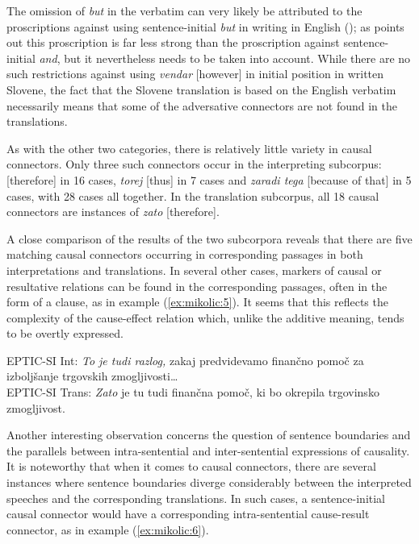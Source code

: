 \documentclass[output=paper]{langscibook}
\begin{document}
The omission of \textit{but} in the verbatim can very likely be attributed to the proscriptions against using sentence-initial \textit{but} in writing in English (\citealt[cf.][183]{Bell2007}); as \citet[194]{Bell2007} points out this proscription is far less strong than the proscription against sentence-initial \textit{and}, but it nevertheless needs to be taken into account. While there are no such restrictions against using \textit{vendar} [however] in initial position in written Slovene, the fact that the Slovene translation is based on the English verbatim necessarily means that some of the adversative connectors are not found in the translations.

As with the other two categories, there is relatively little variety in causal connectors. Only three such connectors occur in the interpreting subcorpus:  [therefore] in 16 cases, \textit{torej} [thus] in 7 cases and \textit{zaradi tega} [because of that] in 5 cases, with 28 cases all together. In the translation subcorpus, all 18 causal connectors are instances of \textit{zato} [therefore].

A close comparison of the results of the two subcorpora reveals that there are five matching causal connectors occurring in corresponding passages in both interpretations and translations. In several other cases, markers of causal or resultative relations can be found in the corresponding passages, often in the form of a clause, as in example (\ref{ex:mikolic:5}). It seems that this reflects the complexity of the cause-effect relation which, unlike the additive meaning, tends to be overtly expressed. 

\ea\label{ex:mikolic:5}
\ea
EPTIC-SI Int: \textit{To je tudi razlog,} zakaj predvidevamo finančno pomoč za izboljšanje trgovskih zmogljivosti\ldots\\
\ex
EPTIC-SI Trans: \textit{Zato} je tu tudi finančna pomoč, ki bo okrepila trgovinsko zmogljivost. \\
\z
\z

Another interesting observation concerns the question of sentence boundaries and the parallels between intra-sentential and inter-sentential expressions of causality. It is noteworthy that when it comes to causal connectors, there are several instances where sentence boundaries diverge considerably between the interpreted speeches and the corresponding translations. In such cases, a sentence-initial causal connector would have a corresponding intra-sentential cause-result connector, as in example (\ref{ex:mikolic:6}). 
\end{document}

